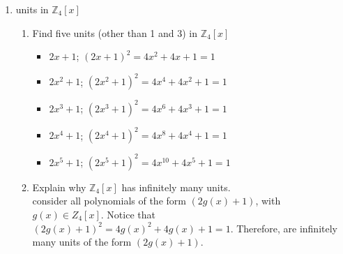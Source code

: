 \documentclass{article}
\newcommand{\Z}{\mathbb{Z}}
\begin{document}
\begin{enumerate}
\begin{enumerate}
			\item If $f(x)$ is monic, then $f(x)$ is not a zero divisor in $R[x]$
			\begin{proof}
				assume f(x) is monic.
				\begin{enumerate}[label=Case \arabic*:]
				\item $f(x)$ is monic and constant. $f(x)= 1_R$. Which is not a zero divisor.
				\item f(x) is monic and non-constant.
				Assume for the sake of contradiction that there exists $g(x) \not= 0_R$ such that $f(x)g(x)=0$. 
				From the above result the $\deg(f(x)g(x))>0$ which is contradicting the assumption that $f(x)g(x)=0$.
				thus $f(x)$ is not a zero divisor.
				\end{enumerate}
				Therefore the original statement holds. 
			\end{proof}
		\end{enumerate}

		\item units in $\Z_4[x]$ 
		\begin{enumerate}
			\item Find five units (other than 1 and 3) in $\Z_4[x]$ 
				\begin{itemize}
					\item $  2x+1$; $(2x  +1)^2 = 4x^2  +4x   +1 = 1$
					\item $2x^2+1$; $(2x^2+1)^2 = 4x^4  +4x^2 +1 = 1$
					\item $2x^3+1$; $(2x^3+1)^2 = 4x^6  +4x^3 +1 = 1$
					\item $2x^4+1$; $(2x^4+1)^2 = 4x^8  +4x^4 +1 = 1$
					\item $2x^5+1$; $(2x^5+1)^2 = 4x^10 +4x^5 +1 = 1$
				\end{itemize}
			\item Explain why $\Z_4[x]$ has infinitely many units.\\
			consider all polynomials of the form $(2g(x)+1)$, with $g(x) \in Z_4[x]$.
			Notice that $(2g(x)+1)^2 = 4g(x)^2 +4g(x)+1 = 1$. Therefore, are infinitely many units of the form $(2g(x)+1)$.   
				
		\end{enumerate}


\end{enumerate}
\end{document}
